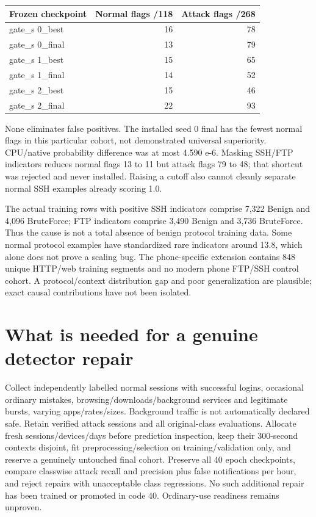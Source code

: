 \documentclass[11pt,a4paper,oneside]{report}
\begin{document}
{\small
\begin{longtable}{@{}p{}rr@{}}
\toprule
Frozen checkpoint & Normal flags /118 & Attack flags /268\\\midrule\endhead
gate\_s 0\_best & 16 & 78\\
gate\_s 0\_final & 13 & 79\\
gate\_s 1\_best & 15 & 65\\
gate\_s 1\_final & 14 & 52\\
gate\_s 2\_best & 15 & 46\\
gate\_s 2\_final & 22 & 93\\
\bottomrule\end{longtable}
}

None eliminates false positives. The installed seed 0 final has the fewest normal flags in this particular cohort, not demonstrated universal superiority. CPU/native probability difference was at most 4.590 e-6. Masking SSH/FTP indicators reduces normal flags 13 to 11 but attack flags 79 to 48; that shortcut was rejected and never installed. Raising a cutoff also cannot cleanly separate normal SSH examples already scoring 1.0.

The actual training rows with positive SSH indicators comprise 7,322 Benign and 4,096 BruteForce; FTP indicators comprise 3,490 Benign and 3,736 BruteForce. Thus the cause is not a total absence of benign protocol training data. Some normal protocol examples have standardized rare indicators around 13.8, which alone does not prove a scaling bug. The phone-specific extension contains 848 unique HTTP/web training segments and no modern phone FTP/SSH control cohort. A protocol/context distribution gap and poor generalization are plausible; exact causal contributions have not been isolated.

\section{What is needed for a genuine detector repair}
Collect independently labelled normal sessions with successful logins, occasional ordinary mistakes, browsing/downloads/background services and legitimate bursts, varying apps/rates/sizes. Background traffic is not automatically declared safe. Retain verified attack sessions and all original-class evaluations. Allocate fresh sessions/devices/days before prediction inspection, keep their 300-second contexts disjoint, fit preprocessing/selection on training/validation only, and reserve a genuinely untouched final cohort. Preserve all 40 epoch checkpoints, compare classwise attack recall and precision plus false notifications per hour, and reject repairs with unacceptable class regressions. No such additional repair has been trained or promoted in code 40. Ordinary-use readiness remains unproven.
\end{document}
